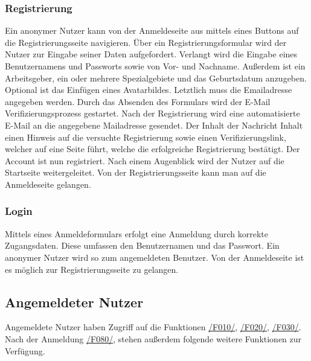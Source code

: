 \subsubsection{Registrierung}
\begin{description}
     Ein anonymer Nutzer kann von der Anmeldeseite aus mittels eines
    Buttons auf die Registrierungsseite navigieren.
     Über ein Registrierungsformular wird der Nutzer zur Eingabe seiner
    Daten aufgefordert. Verlangt wird die Eingabe eines Benutzernamens und Passworts
    sowie von Vor- und Nachname. Außerdem ist ein Arbeitsgeber, ein oder mehrere Spezialgebiete
    und das Geburtsdatum
    anzugeben. Optional ist das Einfügen eines Avatarbildes. Letztlich muss die Emailadresse
    angegeben werden. Durch das Absenden des Formulars wird der E-Mail Verifizierungsprozess
    gestartet.
     Nach der Registrierung wird eine automatisierte E-Mail
    an die angegebene Mailadresse gesendet. Der Inhalt der Nachricht Inhalt einen Hinweis auf
    die versuchte Registrierung sowie einen Verifizierungslink, welcher auf eine Seite führt, welche
    die erfolgreiche Registrierung bestätigt. Der Account ist nun registriert. Nach einem Augenblick wird der Nutzer auf die Startseite
    weitergeleitet.
     Von der Registrierungsseite kann man auf die Anmeldeseite gelangen.
\end{description}

\subsubsection{Login}
\begin{description}
     Mittels eines Anmeldeformulars erfolgt eine Anmeldung durch korrekte Zugangsdaten.
    Diese umfassen den Benutzernamen und das Passwort. Ein anonymer Nutzer wird so zum angemeldeten Benutzer.
     Von der Anmeldeseite ist es möglich zur Registrierungsseite zu gelangen.
\end{description}

\subsection{Angemeldeter Nutzer}
Angemeldete Nutzer haben Zugriff auf die Funktionen
\hyperref[funkt:010]{/F010/}, \hyperref[funkt:020]{/F020/}, \hyperref[funkt:030]{/F030/}.
Nach der Anmeldung \hyperref[funkt:080]{/F080/},
stehen außerdem folgende weitere Funktionen zur Verfügung.

